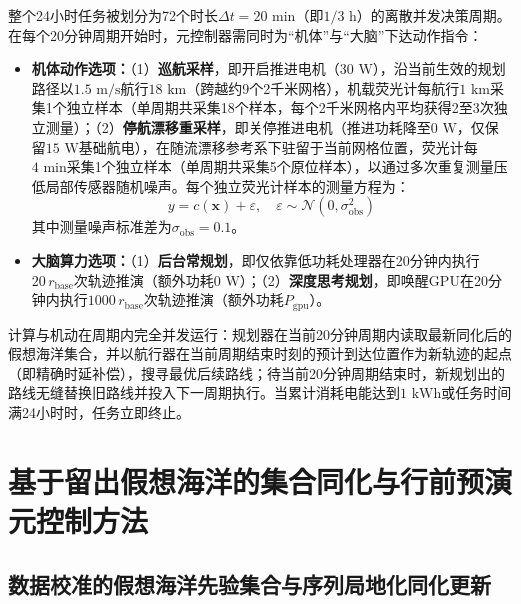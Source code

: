 整个24小时任务被划分为72个时长$\Delta t = 20\text{ min}$（即$1/3\text{ h}$）的离散并发决策周期\cite{xiao2020thinking, elboher2023formal}。在每个20分钟周期开始时，元控制器需同时为“机体”与“大脑”下达动作指令：
\begin{itemize}
  \item \textbf{机体动作选项：}（1）\textbf{巡航采样}，即开启推进电机（$30\text{ W}$），沿当前生效的规划路径以$1.5\text{ m/s}$航行$18\text{ km}$（跨越约9个2千米网格），机载荧光计每航行$1\text{ km}$采集1个独立样本（单周期共采集18个样本，每个2千米网格内平均获得2至3次独立测量）；（2）\textbf{停航漂移重采样}，即关停推进电机（推进功耗降至$0\text{ W}$，仅保留$15\text{ W}$基础航电），在随流漂移参考系下驻留于当前网格位置，荧光计每$4\text{ min}$采集1个独立样本（单周期共采集5个原位样本），以通过多次重复测量压低局部传感器随机噪声。每个独立荧光计样本的测量方程为：
  \begin{equation}
    y = c(\mathbf{x}) + \varepsilon, \quad \varepsilon \sim \mathcal{N}(0, \sigma_{\text{obs}}^2)
    \label{eq:obs}
  \end{equation}
  其中测量噪声标准差为$\sigma_{\text{obs}} = 0.1$。
  \item \textbf{大脑算力选项：}（1）\textbf{后台常规划}，即仅依靠低功耗处理器在20分钟内执行$20\,r_{\text{base}}$次轨迹推演（额外功耗$0\text{ W}$）；（2）\textbf{深度思考规划}，即唤醒GPU在20分钟内执行$1000\,r_{\text{base}}$次轨迹推演（额外功耗$P_{\text{gpu}}$）。
\end{itemize}
计算与机动在周期内完全并发运行：规划器在当前20分钟周期内读取最新同化后的假想海洋集合，并以航行器在当前周期结束时刻的预计到达位置作为新轨迹的起点（即精确时延补偿），搜寻最优后续路线；待当前20分钟周期结束时，新规划出的路线无缝替换旧路线并投入下一周期执行。当累计消耗电能达到$1\text{ kWh}$或任务时间满24小时时，任务立即终止。

\section{基于留出假想海洋的集合同化与行前预演元控制方法}

\subsection{数据校准的假想海洋先验集合与序列局地化同化更新}

